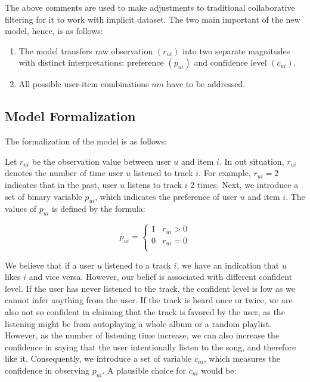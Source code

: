 The above comments are used to make adjustments to traditional collaborative filtering for it to work with implicit dataset. The two main important of the new model, hence, is as follows:

\begin{enumerate}
	\item The model transfers raw observation \((r_{ui})\) into two separate magnitudes with distinct interpretations: preference \((p_{ui})\) and confidence level \((c_{ui})\). 
	\item All possible user-item combinations \( n \dot m\) have to be addressed. 
\end{enumerate}

\subsection{Model Formalization}
The formalization of the model is as follows: 

Let \(r_{ui}\) be the observation value between user \(u\) and item \(i\). In out situation, \(r_{ui}\) denotes the number of time user \(u\) listened to track \(i\). For example, \(r_{ui} = 2\) indicates that in the past, user \(u\) listens to track \(i\) 2 times. Next, we introduce a set of binary variable \(p_{ui}\), which indicates the preference of user \(u\) and item \(i\). The values of \(p_{ui}\) is defined by the formula: 

\begin{displaymath}
p_{ui} = \left\{ \begin{array}{lc} 
1 &  r_{ui} > 0\\
0 & r_{ui} = 0\\
\end{array}
\right. 
\end{displaymath}

We believe that if a user \(u\) listened to a track \(i\), we have an indication that \(u\) likes \(i\) and vice versa. However, our belief is associated with different confident level. If the user has never listened to the track, the confident level is low as we cannot infer anything from the user. If the track is heard once or twice, we are also not so confident in claiming that the track is favored by the user, as the listening might be from autoplaying a whole album or a random playlist. However, as the number of listening time increase, we can also increase the confidence in saying that the user intentionally listen to the song, and therefore like it. Consequently, we introduce a set of variable \(c_{ui}\), which measures the confidence in observing \(p_{ui}\). A plausible choice for \(c_{ui}\) would be:

